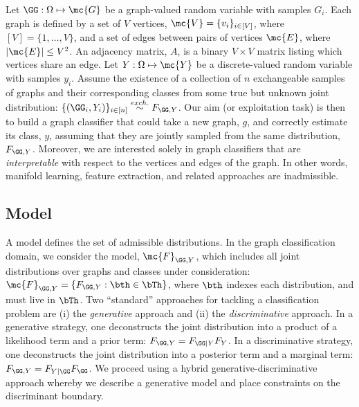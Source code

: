 \documentclass[10pt,journal,cspaper,compsoc]{IEEEtran}
\begin{document}
Let $\GG: \Omega \mapsto \mc{G}$ be a graph-valued random variable with samples $G_i$.  Each graph is defined by a set of $V$ vertices, $\mc{V}=\{v_i\}_{i \in [V]}$, where $[V]=\{1,\ldots, V\}$, and a set of edges between pairs of vertices $\mc{E}$, where $|\mc{E}| \leq V^2$. An adjacency matrix, $A$, is a binary $V \times V$ matrix listing  which vertices share an edge. Let $Y:\Omega \mapsto \mc{Y}$ be a discrete-valued random variable with samples $y_i$.  Assume the existence of a collection of $n$ exchangeable samples of graphs and their corresponding classes from some true but unknown joint distribution: $\{(\GG_i,Y_i)\}_{i \in [n]} \overset{exch.}{\sim} F_{\GG,Y}$. Our aim (or exploitation task) is then to build a graph classifier that could take a new graph, $g$, and correctly estimate its class, $y$, assuming that they are jointly sampled from the same distribution, $F_{\GG,Y}$.  Moreover, we are interested solely in graph classifiers that are \emph{interpretable} with respect to the vertices and edges of the graph. In other words, manifold learning, feature extraction, and related approaches are inadmissible.  

\subsection{Model} %
\label{sub:model}

A model defines the set of admissible distributions.  In the graph classification domain, we consider the model, $\mc{F}_{\GG,Y}$, which includes all joint distributions over graphs and classes under consideration: $\mc{F}_{\GG,Y}=\{F_{\GG, Y} : \bth \in \bTh\}$, where $\bth$ indexes each distribution, and must live in $\bTh$.  Two ``standard'' approaches for tackling a classification problem are (i) the \emph{generative} approach and (ii) the \emph{discriminative} approach.  In a generative strategy, one deconstructs the joint distribution into a product of a likelihood term and a prior term:  $F_{\GG,Y}=F_{\GG | Y}F_Y$.  In a discriminative strategy, one deconstructs the joint distribution into a posterior term and a marginal term: $F_{\GG,Y}=F_{Y | \GG}F_{\GG}$.  We proceed using a hybrid generative-discriminative approach whereby we describe a generative model and place constraints on the discriminant boundary.
\end{document}
